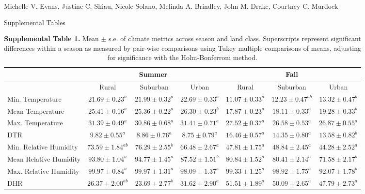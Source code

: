\documentclass[12pt]{article}
\begin{document}
{\Large
\textbf{}}

\bigskip

Michelle V. Evans,
Justine C. Shiau,
Nicole Solano,
Melinda A. Brindley,
John M. Drake,
Courtney C. Murdock
\smallskip

{\Large{Supplemental Tables}}

\newpage

\begin{landscape}

\begin{table}[]
\centering
\caption{\textbf{Supplemental Table 1.} Mean $\pm$ s.e. of climate metrics across season and land class. Superscripts represent significant differences within a season as measured by pair-wise comparisons using Tukey multiple comparisons of means, adjusting for significance with the Holm-Bonferroni method.}
\begin{tabular}{l|ccc|ccc}
	                       & \multicolumn{3}{c}{Summer}                            & \multicolumn{3}{c}{Fall}                              \\
	\hline
	                       & Rural            & Suburban        & Urban            & Rural            & Suburban         & Urban           \\
	\hline
	Min. Temperature       & $21.69 \pm 0.23^a$  & $21.99 \pm 0.32^a$ & $22.69 \pm 0.33^a$  & $11.07 \pm 0.33^a$  & $12.23 \pm 0.47^{ab}$ & $13.32 \pm 0.47^b$ \\
	Mean Temperature       & $25.41 \pm 0.16^a$  & $25.36 \pm 0.22^a$ & $26.30 \pm 0.23^b$  & $17.87 \pm 0.23^a$  & $18.11 \pm 0.33^a$  & $19.28 \pm 0.33^b$ \\
	Max. Temperature       & $31.39 \pm 0.49^a$  & $30.86 \pm 0.68^a$ & $31.41 \pm 0.71^a$  & $27.52 \pm 0.37^a$  & $26.58 \pm 0.53^a$  & $26.87 \pm 0.55^a$ \\
	DTR                    & $9.82 \pm 0.55^a$   & $8.86 \pm 0.76^a$  & $8.75 \pm 0.79^a$   & $16.46 \pm 0.57^a$  & $14.35 \pm 0.80^a$  & $13.58 \pm 0.82^b$ \\
	Min. Relative Humidity & $73.59 \pm 1.84^{ab}$ & $76.29 \pm 2.55^b$ & $66.48 \pm 2.67^a$  & $47.81 \pm 1.75^a$  & $48.84 \pm 2.45^a$  & $44.28 \pm 2.52^a$ \\
	Mean Relative Humidity & $93.80 \pm 1.04^a$ & $94.77 \pm 1.45^a$ & $87.52 \pm 1.51^b$ & $80.84  \pm 1.52^a$ & $80.41 \pm 2.14^a$  & $71.58 \pm 2.17^b$ \\
	Max. Relative Humidity & $99.97 \pm 0.84^a$  & $99.97 \pm 1.31^a$ & $98.09 \pm 1.37^a$  & $99.33 \pm 1.25^a$  & $98.92 \pm 1.75^a$  & $92.07 \pm 1.78^b$ \\
	DHR                    & $26.37 \pm 2.00^{ab}$ & $23.69 \pm 2.77^b$ & $31.62 \pm 2.90^a$  & $51.51 \pm 1.89^a$  & $50.09 \pm 2.65^a$  & $47.79 \pm 2.73^a$
\end{tabular}
\end{table}


\end{landscape}
\end{document}
